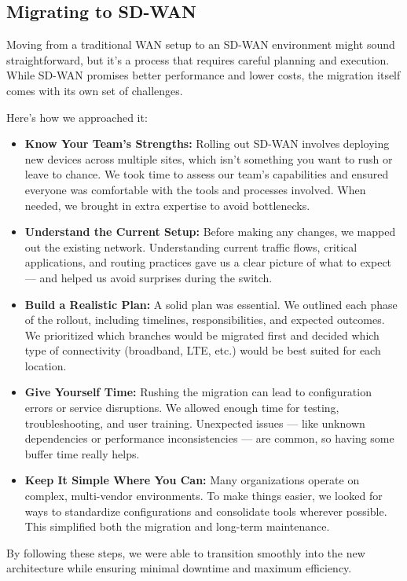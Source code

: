 \documentclass[12pt,english]{report}
\begin{document}
\subsection{Migrating to SD-WAN}

Moving from a traditional WAN setup to an SD-WAN environment might sound straightforward, but it’s a process that requires careful planning and execution. While SD-WAN promises better performance and lower costs, the migration itself comes with its own set of challenges.

Here's how we approached it:
\begin{itemize}
    \item \textbf{Know Your Team’s Strengths:} Rolling out SD-WAN involves deploying new devices across multiple sites, which isn’t something you want to rush or leave to chance. We took time to assess our team’s capabilities and ensured everyone was comfortable with the tools and processes involved. When needed, we brought in extra expertise to avoid bottlenecks.

    \item \textbf{Understand the Current Setup:} Before making any changes, we mapped out the existing network. Understanding current traffic flows, critical applications, and routing practices gave us a clear picture of what to expect — and helped us avoid surprises during the switch.

    \item \textbf{Build a Realistic Plan:} A solid plan was essential. We outlined each phase of the rollout, including timelines, responsibilities, and expected outcomes. We prioritized which branches would be migrated first and decided which type of connectivity (broadband, LTE, etc.) would be best suited for each location.

    \item \textbf{Give Yourself Time:} Rushing the migration can lead to configuration errors or service disruptions. We allowed enough time for testing, troubleshooting, and user training. Unexpected issues — like unknown dependencies or performance inconsistencies — are common, so having some buffer time really helps.

    \item \textbf{Keep It Simple Where You Can:} Many organizations operate on complex, multi-vendor environments. To make things easier, we looked for ways to standardize configurations and consolidate tools wherever possible. This simplified both the migration and long-term maintenance.
\end{itemize} 
By following these steps, we were able to transition smoothly into the new architecture while ensuring minimal downtime and maximum efficiency\cite{ref3}.
\end{document}
